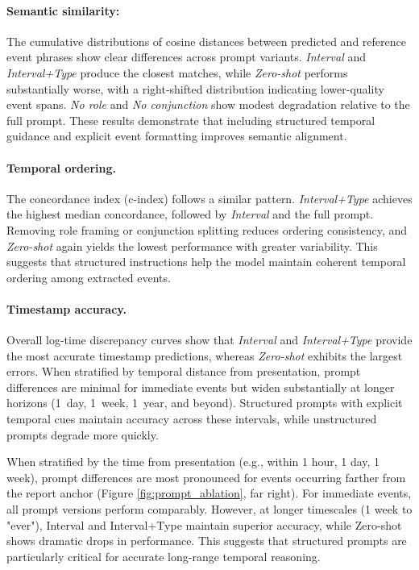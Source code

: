 %

\paragraph{Semantic similarity:}
The cumulative distributions of cosine distances between predicted and reference event phrases show clear differences across prompt variants. \emph{Interval} and \emph{Interval+Type} produce the closest matches, while \emph{Zero-shot} performs substantially worse, with a right-shifted distribution indicating lower-quality event spans. \emph{No role} and \emph{No conjunction} show modest degradation relative to the full prompt. These results
demonstrate that including structured temporal guidance and explicit event formatting improves semantic alignment.

\paragraph{Temporal ordering.}
The concordance index (c-index) follows a similar pattern. \emph{Interval+Type} achieves the highest median concordance, followed by \emph{Interval} and the full prompt. Removing role
framing or conjunction splitting reduces ordering consistency, and \emph{Zero-shot} again yields the lowest performance with greater variability. This suggests that structured instructions help the model maintain coherent temporal ordering among extracted events.

\paragraph{Timestamp accuracy.}
Overall log-time discrepancy curves show that \emph{Interval} and \emph{Interval+Type} provide the most accurate timestamp predictions, whereas \emph{Zero-shot} exhibits the largest errors. When stratified by temporal distance from presentation, prompt differences are minimal for
immediate events but widen substantially at longer horizons (1~day, 1~week, 1~year, and beyond). Structured prompts with explicit temporal cues maintain accuracy across these
intervals, while unstructured prompts degrade more quickly.

When stratified by the time from presentation (e.g., within 1 hour, 1 day, 1 week), prompt differences are most pronounced for events occurring farther from the report anchor (Figure \ref{fig:prompt_ablation}, far right). For immediate events, all prompt versions perform comparably. However, at longer timescales (1 week to "ever"), Interval and Interval+Type maintain superior accuracy, while Zero-shot shows dramatic drops in performance. This suggests that structured prompts are particularly critical for accurate long-range temporal reasoning.

